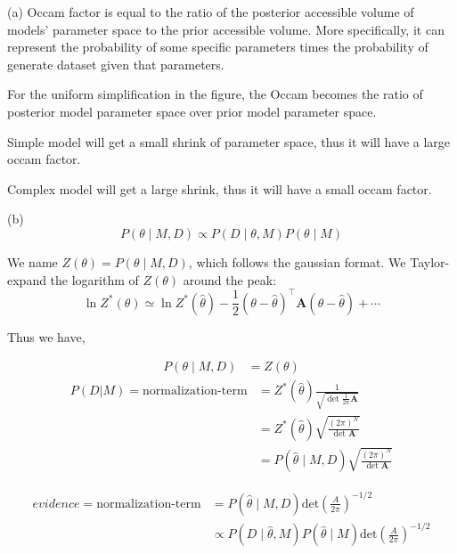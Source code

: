 \documentclass[11pt]{article}
\begin{document}
\begin{enumerate}
(a)
Occam factor is equal to the ratio of the posterior accessible volume of models' parameter space to the prior accessible volume. More specifically, it can represent the probability of some specific parameters times the probability of generate dataset given that parameters. 

For the uniform simplification in the figure, the Occam becomes the ratio of posterior model parameter space over prior model parameter space.

Simple model will get a small shrink of parameter space, thus it will have a large occam factor.

Complex model will get a large shrink, thus it will have a small occam factor.

(b)
\begin{equation}
    P\left(\theta \mid M, D\right) \propto P\left(D \mid \theta, M\right) P\left(\theta \mid M\right)
\end{equation}

We name $Z(\theta) = P\left(\theta \mid M, D\right) $, which follows the gaussian format. We Taylor-expand the logarithm of $Z(\theta)$ around the peak:
\begin{equation}
    \ln Z^{*}(\theta) \simeq \ln Z^{*}(\hat{\theta{}})-\frac{1}{2}\left(\theta - \hat{\theta}\right)^{\top} \mathbf{A}\left(\theta - \hat{\theta}\right)+\cdots
\end{equation}



Thus we have,

\begin{align}
    P\left(\theta \mid M, D\right) &= Z(\theta) 
\end{align}
\begin{align}
    P(D|M) = \text{normalization-term} &=Z^{*}\left(\hat{\theta} \right) \frac{1}{\sqrt
    {\operatorname{det} \frac{1}{2 \pi} \mathbf{A}}}\\
    &=Z^{*}\left(\hat{\theta} \right) \sqrt{\frac{(2 \pi)^{N}}{\operatorname{det} \mathbf{A}}} \\
    &=P\left(\hat{\theta} \mid M, D\right) \sqrt{\frac{(2 \pi)^{N}}{\operatorname{det} \mathbf{A}}}
\end{align}


\begin{align}
    evidence = \text{normalization-term} &=  P(\hat{\theta} \mid M, D) \text{det}(\frac{A}{2 \pi})^{-1/2} \\
    &\propto P\left(D \mid \hat{\theta}, M\right) P\left(\hat{\theta} \mid M\right) \text{det}(\frac{A}{2 \pi})^{-1/2}
\end{align}


\end{enumerate}
\end{document}
